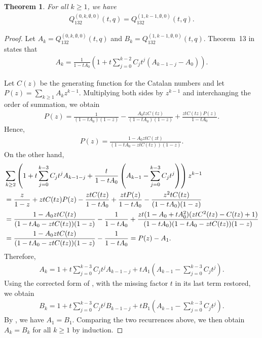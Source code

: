 \documentclass[11pt]{article}
\newtheorem{thm}{Theorem}[section]
\begin{document}
\begin{thm}\label{thm-distribution}
For all $k\ge1$, we have
\begin{align*}
Q_{132}^{(0,k,\emptyset,0)}(t,q)=Q_{132}^{(1,k-1,\emptyset,0)}(t,q).  
\end{align*}
\end{thm}
\begin{proof}
Let $A_k=Q_{132}^{(0,k,\emptyset,0)}(t,q)$ and $B_k=Q_{132}^{(1,k-1,\emptyset,0)}(t,q)$. 
Theorem~13 in \cite{QiuRemmel2018} states that
\begin{align*}
A_k=\frac1{1-tA_0}\left(1+t\sum_{j=0}^{k-2}C_jt^j(A_{k-1-j}-A_0)\right).    
\end{align*}

Let $C(z)$ be the generating function for the Catalan numbers and let
$P(z)=\sum_{k\geq1}A_kz^{k-1}$.
Multiplying both sides by $z^{k-1}$ and interchanging the order of summation,
we obtain
\begin{align*}
P(z)=\frac1{(1-tA_0)(1-z)}
-\frac{A_0tzC(tz)}{(1-tA_0)(1-z)}
+\frac{ztC(tz)P(z)}{1-tA_0}.
\end{align*}
Hence,
\begin{align*}
P(z)=\frac{1-A_0ztC(zt)}
{(1-tA_0-ztC(tz))(1-z)}.
\end{align*}
On the other hand,
\begin{align}
&\sum_{k\geq2}\left(
1+t\sum_{j=0}^{k-3}C_jt^jA_{k-1-j}
+\frac t{1-tA_0}\left(
A_{k-1}-\sum_{j=0}^{k-3}C_jt^j
\right)\right)z^{k-1}\notag\\
&=\frac z{1-z}+ztC(tz)P(z)-\frac{ztC(tz)}{1-tA_0}
+\frac{ztP(z)}{1-tA_0}
-\frac{z^2tC(tz)}{(1-tA_0)(1-z)}\notag\\
&=\frac{1-A_0ztC(tz)}
{(1-tA_0-ztC(tz))(1-z)}
-\frac1{1-tA_0}
+\frac{zt(1-A_0+tA_0^2)(ztC^2(tz)-C(tz)+1)}
{(1-tA_0)(1-tA_0-ztC(tz))(1-z)}\notag\\
&=\frac{1-A_0ztC(tz)}
{(1-tA_0-ztC(tz))(1-z)}
-\frac1{1-tA_0}
=P(z)-A_1.
\end{align}
Therefore,
\begin{align*}
A_k
=
1+t\sum_{j=0}^{k-3}C_jt^jA_{k-1-j}
+tA_1\left(
A_{k-1}-\sum_{j=0}^{k-3}C_jt^j
\right).
\end{align*}
Using the corrected form of \cite[Theorem 14]{QiuRemmel2018},
with the missing factor $t$ in its last term restored, we obtain
\begin{align*}
B_k
=
1+t\sum_{j=0}^{k-3}C_jt^jB_{k-1-j}
+tB_1\left(
A_{k-1}-\sum_{j=0}^{k-3}C_jt^j
\right).
\end{align*}
By \cite[Eq.~(58)]{QiuRemmel2018}, we have $A_1=B_1$.
Comparing the two recurrences above, we then obtain
$A_k=B_k$ for all $k\geq1$ by induction.
\end{proof}
\end{document}

